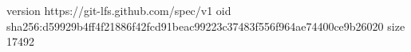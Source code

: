 version https://git-lfs.github.com/spec/v1
oid sha256:d59929b4ff4f21886f42fcd91beac99223c37483f556f964ae74400ce9b26020
size 17492
